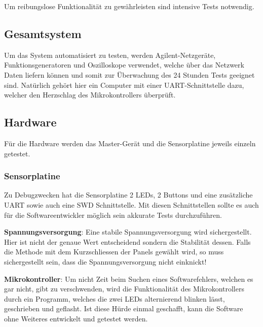 Um  reibungslose  Funktionalit\"at  zu gew\"ahrleisten  sind  intensive  Tests
notwendig.


\subsection{Gesamtsystem}

Um   das  System   automatisiert  zu   testen,  werden   Agilent-Netzger\"ate,
Funktionsgeneratoren und  Oszilloskope verwendet,  welche \"uber  das Netzwerk
Daten  liefern   k\"onnen  und   somit  zur   \"Uberwachung  des   24  Stunden
Tests  geeignet  sind. Nat\"urlich  geh\"ort   hier  ein  Computer  mit  einer
UART-Schnittstelle   dazu,  welcher   den   Herzschlag  des   Mikrokontrollers
\"uberpr\"uft.

\subsection{Hardware}

F\"ur die  Hardware werden  das Master-Ger\"at  und die  Sensorplatine jeweils
einzeln getestet.

\subsubsection{Sensorplatine}

Zu Debugzwecken hat die Sensorplatine 2 LEDs, 2 Buttons und eine zus\"atzliche
UART  sowie  auch eine  SWD  Schnittstelle. Mit  diesen Schnittstellen  sollte
es   auch  f\"ur   die  Softwareentwickler   m\"oglich  sein   akkurate  Tests
durchzuf\"uhren.

\textbf{Spannungsversorgung}: Eine     stabile    Spannungsversorgung     wird
sichergestellt. Hier  ist  nicht  der  genaue Wert  entscheidend  sondern  die
Stabilit\"at  dessen. Falls  die Methode  mit  dem  Kurzschliessen der  Panels
gew\"ahlt  wird, so  muss  sichergestellt sein,  dass die  Spannungsversorgung
nicht einknickt!

\textbf{Mikrokontroller}: Um  nicht Zeit  beim  Suchen eines  Softwarefehlers,
welchen  es gar nicht, gibt  zu  verschwenden, wird  die Funktionalit\"at  des
Mikrokontrollers  durch  ein  Programm,  welches die  zwei  LEDs  alternierend
blinken l\"asst, geschrieben und geflasht. Ist diese H\"urde einmal geschafft,
kann die Software ohne Weiteres entwickelt und getestet werden.

